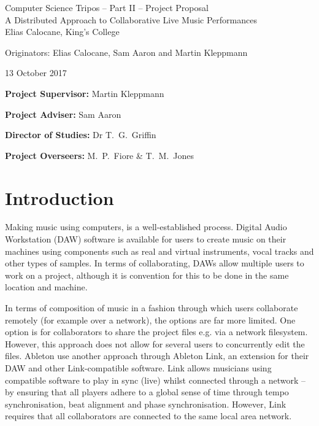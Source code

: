 \documentclass[12pt,a4paper,twoside]{article}
\begin{document}
\begin{center}
\Large
Computer Science Tripos -- Part II -- Project Proposal\\[4mm]
\LARGE
A Distributed Approach to Collaborative Live Music Performances\\[4mm]

\large
Elias Calocane, King's College

Originators: Elias Calocane, Sam Aaron and Martin Kleppmann

13 October 2017
\end{center}

\vspace{5mm}

\textbf{Project Supervisor:} Martin Kleppmann

\textbf{Project Adviser:} Sam Aaron

\textbf{Director of Studies:} Dr T.~G.~Griffin

\textbf{Project Overseers:} M.~P.~Fiore  \& T.~M.~Jones


\section*{Introduction}

Making music using computers, is a well-established process. Digital Audio Workstation (DAW) software is available for users to create music on their machines using components such as real and virtual instruments, vocal tracks and other types of samples. In terms of collaborating, DAWs allow multiple users to work on a project, although it is convention for this to be done in the same location and machine.

In terms of composition of music in a fashion through which users collaborate remotely (for example over a network), the options are far more limited. One option is for collaborators to share the project files e.g. via a network filesystem. However, this approach does not allow for several users to concurrently edit the files. Ableton use another approach through Ableton Link, an extension for their DAW and other Link-compatible software. Link allows musicians using compatible software to play in sync (live) whilst connected through a network -- by ensuring that all players adhere to a global sense of time through tempo synchronisation, beat alignment and phase synchronisation. However, Link requires that all collaborators are connected to the same local area network.
\end{document}
